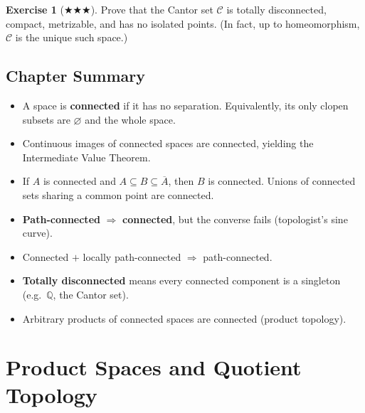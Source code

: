 \documentclass[11pt,a4paper,twoside]{book}
\theoremstyle{remark}
\theoremstyle{definition}
\newtheorem{exerciseplain}[theorem]{Exercise}
\theoremstyle{definition}
\newenvironment{exercise}[1][]{%
  \begin{exerciseplain}[#1]
}{%
  \end{exerciseplain}
}
\begin{document}
\begin{exercise}[$\bigstar\bigstar\bigstar$]\label{exo:cantor-characterization}
Prove that the Cantor set $\mathcal{C}$ is totally disconnected,
compact, metrizable, and has no isolated points.  (In fact, up to
homeomorphism, $\mathcal{C}$ is the unique such space.)
\end{exercise}

\section*{Chapter Summary}

\begin{itemize}
\item A space is \textbf{connected} if it has no separation.
      Equivalently, its only clopen subsets are $\varnothing$ and
      the whole space.
\item Continuous images of connected spaces are connected, yielding
      the Intermediate Value Theorem.
\item If $A$ is connected and $A\subseteq B\subseteq\overline{A}$,
      then $B$ is connected.  Unions of connected sets sharing a
      common point are connected.
\item \textbf{Path-connected} $\Longrightarrow$ \textbf{connected},
      but the converse fails (topologist's sine curve).
\item Connected $+$ locally path-connected $\Longrightarrow$
      path-connected.
\item \textbf{Totally disconnected} means every connected component
      is a singleton (e.g.\ $\mathbb{Q}$, the Cantor set).
\item Arbitrary products of connected spaces are connected
      (product topology).
\end{itemize}



\chapter{Product Spaces and Quotient Topology}\label{ch:product-quotient}

\end{document}
